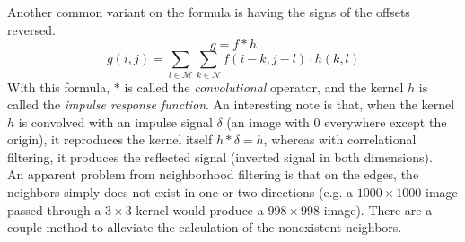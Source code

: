 \documentclass[twoside,a4paper,article]{combine}
\begin{document}
Another common variant on the formula is having the signs of the offsets reversed. 
\[
    g = f \ast h
\]
\[
    g(i,j) = \sum_{l \in \mathscr{M}}\sum_{k \in \mathscr{N}}{f(i-k, j-l) \cdot h(k, l)}
\]
With this formula, $\ast$ is called the \emph{convolutional} operator, and the kernel $h$ is called the \emph{impulse response function}. An interesting note is that, 
when the kernel $h$ is convolved with an impulse signal $\delta$ (an image with 0 everywhere except the origin),
it reproduces the kernel itself $h \ast \delta = h$, whereas with correlational filtering, it produces the reflected signal (inverted signal in both dimensions).\\

An apparent problem from neighborhood filtering is that on the edges, the neighbors simply does not exist in one or two directions (e.g. a $1000\times1000$ image passed
through a $3\times3$ kernel would produce a $998\times998$ image). There are a couple method to alleviate the calculation of the nonexistent neighbors.

\begin{minipage}{\textwidth}\begin{figure}[H]
    \centering
    
\end{figure}\end{minipage}
\end{document}
